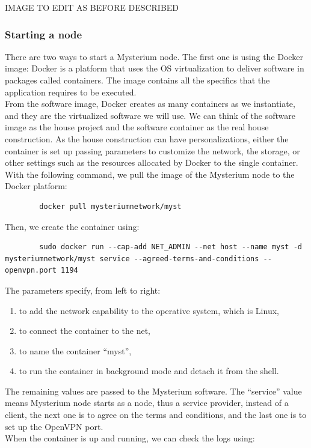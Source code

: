 \documentclass[12pt]{article}
\begin{document}
	IMAGE TO EDIT AS BEFORE DESCRIBED\\

	\subsubsection{Starting a node}
	There are two ways to start a Mysterium node. The first one is using the Docker image: Docker is a platform that uses the OS virtualization to deliver software in packages called containers. The image contains all the specifics that the application requires to be executed.\\
	From the software image, Docker creates as many containers as we instantiate, and they are the virtualized software we will use.  We can think of the software image as the house project and the software container as the real house construction. As the house construction can have personalizations, either the container is set up passing parameters to customize the network, the storage, or other settings such as the resources allocated by Docker to the single container.\\
	With the following command, we pull the image of the Mysterium node to the Docker platform:
	\begin{verbatim}
		docker pull mysteriumnetwork/myst
	\end{verbatim}
	
	Then, we create the container using:\\

	\begin{verbatim}
		sudo docker run --cap-add NET_ADMIN --net host --name myst -d mysteriumnetwork/myst service --agreed-terms-and-conditions --openvpn.port 1194
	\end{verbatim}

	The parameters specify, from left to right:
	\begin{enumerate}
		\item to add the network capability to the operative system, which is Linux,
		\item to connect the container to the net,
		\item to name the container ``myst'',
		\item to run the container in background mode and detach it from the shell.
	\end{enumerate}

	The remaining values are passed to the Mysterium software. The ``service'' value means Mysterium node starts as a node, thus a service provider, instead of a client, the next one is to agree on the terms and conditions, and the last one is to set up the OpenVPN port.\\
	When the container is up and running, we can check the logs using:
\end{document}
